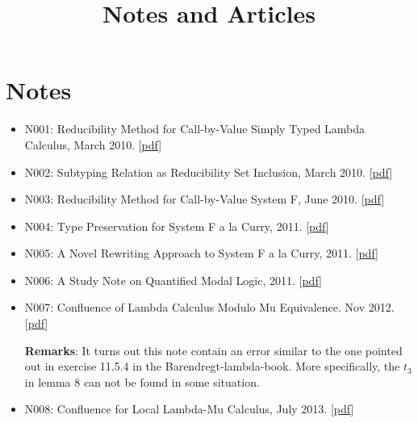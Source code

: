 \documentclass[10pt]{article}
\title{\bfseries\Large Notes and Articles}
\date{}
\begin{document}
\maketitle
\vspace{-4em}

\vspace{20pt}


\section*{Notes}
\begin{itemize}
\item N001: Reducibility Method for Call-by-Value Simply Typed Lambda Calculus, March 2010. [\href{../../document/notes/reducibility-stlc.pdf}{pdf}]

\item N002: Subtyping Relation as Reducibility Set Inclusion, March 2010. [\href{../../document/notes/subtyping-st.pdf}{pdf}]

\item N003: Reducibility Method for Call-by-Value System F, June 2010. [\href{../../document/notes/system-f-iii.pdf}{pdf}]

\item N004: Type Preservation for System F a la Curry, 2011. [\href{../../document/notes/systemf.pdf}{pdf}] 

\item N005: A Novel Rewriting Approach to System F a la Curry, 2011. [\href{../../document/notes/side-proj.pdf}{pdf}] 

\item N006: A Study Note on Quantified Modal Logic, 2011. [\href{../../document/notes/kripke-models.pdf}{pdf}]

\item N007: Confluence of Lambda Calculus Modulo Mu Equivalence. Nov 2012. [\href{../../document/notes/conf-lambda-mu-I.pdf}{pdf}]

\noindent  \textbf{Remarks}: It turns out this note contain an error similar to the one pointed out in exercise 11.5.4 in the Barendregt-lambda-book. More specifically, the $t_3$ in lemma 8 can not be found in some situation. 


\item N008: Confluence for Local Lambda-Mu Calculus, July 2013. [\href{../../document/notes/conf-lambda-mu-II.pdf}{pdf}]


\end{itemize}
\end{document}
